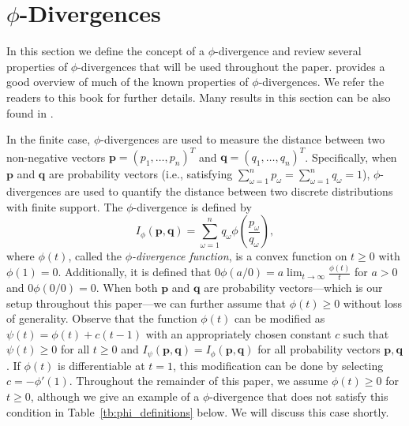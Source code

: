 \documentclass[opre,nonblindrev]{informs3} %
\newcommand{\q}{\mathbf{q}}
\newcommand{\p}{\mathbf{p}}
\begin{document}
\section{$\phi$-Divergences} %
\label{sec:phi_divergences}

In this section we define the concept of a $\phi$-divergence and review several properties of  $\phi$-divergences that will be used throughout the paper. 
\citet{pardo2005statistical} provides a good overview of much of the known properties of $\phi$-divergences. 
We refer the readers to this book for further details.
Many results in this section can be also found in \cite{bental1991certainty,bental2011robust}.

In the finite case, $\phi$-divergences are used to measure the distance between two non-negative vectors $\p = (p_1, \dots, p_n)^T$ and $\q = (q_1, \dots, q_n)^T$.
Specifically, when $\p$ and $\q$ are probability vectors (i.e., satisfying $\sum_{\omega=1}^n p_\omega = \sum_{\omega=1}^n q_\omega = 1$), $\phi$-divergences are used to quantify the distance between two discrete distributions with finite support. 
The $\phi$-divergence is defined by
\[
	I_\phi(\p,\q) = \sum_{\omega=1}^n q_\omega \phi\left(\frac{p_\omega}{q_\omega}\right),
\]
where $\phi(t)$, called the {\it $\phi$-divergence function}, is a convex function on $t \geq 0$ with $\phi(1) = 0$.
Additionally, it is defined that $0 \phi(a/0) = a \lim_{t \rightarrow \infty} \frac{\phi(t)}{t}$ for $a>0$ and $0 \phi(0/0) = 0$.
When both $\p$ and $\q$ are probability vectors---which is our setup throughout this paper---we can further assume that $\phi(t) \geq 0$ without loss of generality. 
Observe that the function $\phi(t)$ can be modified as $\psi(t) = \phi(t) + c(t-1)$ with an appropriately chosen constant $c$ such that $\psi(t) \geq 0$ for all $t\geq 0$ and $I_\psi(\p,\q) = I_\phi(\p,\q)$ for all probability vectors $\p,\q$.
If $\phi(t)$ is differentiable at $t = 1$, this modification can be done by selecting $c = -\phi'(1)$.
Throughout the remainder of this paper, we assume $\phi(t) \geq 0$ for $t\geq 0$, although we give an example of a $\phi$-divergence that does not satisfy this condition in Table~\ref{tb:phi_definitions} below. 
We will discuss this case shortly. 
\end{document}
